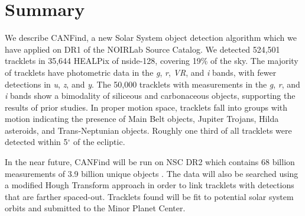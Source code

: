 \documentclass[twocolumn]{aastex62}
\begin{document}
\section{Summary}
\label{sec:summary}

We describe CANFind, a new Solar System object detection algorithm which we have applied on DR1 of the NOIRLab Source Catalog.  We detected 524,501 tracklets in 35,644 HEALPix of nside-128, covering 19\% of the sky. 
The majority of tracklets have photometric data in the \textit{g}, \textit{r}, \textit{VR}, and \textit{i} bands, with fewer detections in \textit{u}, \textit{z}, and \textit{y}.  The 50,000 tracklets with measurements in the \textit{g}, \textit{r}, and \textit{i} bands show a bimodality of siliceous and carbonaceous objects, supporting the results of prior studies.  In proper motion space, tracklets fall into groups with motion indicating the presence of Main Belt objects, Jupiter Trojans, Hilda asteroids, and Trans-Neptunian objects.  Roughly one third of all tracklets were detected within 5$^{\circ}$ of the ecliptic.  

In the near future, CANFind will be run on NSC DR2 which contains 68 billion measurements of 3.9 billion unique objects \citep{Nidever2020}.  The data will also be searched using a modified Hough Transform approach in order to link tracklets with detections that are farther spaced-out.  Tracklets found will be fit to potential solar system orbits and submitted to the Minor Planet Center.  

\end{document}
